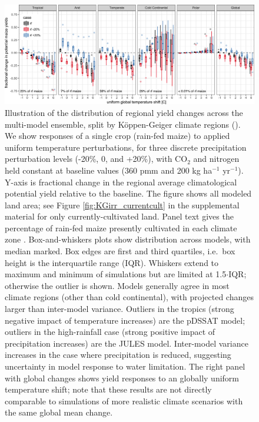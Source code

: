 \documentclass[preprint, 5p, times, twocolumn]{elsarticle}
\begin{document}
\begin{figure}[!b]
\centering
   \includegraphics[width=0.95\linewidth]{global_sim_CG.png}
   \caption{Illustration of the distribution of regional yield changes across the multi-model ensemble, split by K\"{o}ppen-Geiger climate regions (\cite{rubel2010}).
    We show responses of a single crop (rain-fed maize) to applied uniform temperature perturbations, for three discrete precipitation perturbation levels (-20\%, 0, and +20\%), with CO$_2$ and nitrogen held constant at baseline values (360 pmm and 200 kg ha$^{-1}$ yr$^{-1}$). Y-axis is fractional change in the regional average climatological potential yield relative to the baseline. The figure shows all modeled land area; see Figure \ref{fig:KGirr_currentcult} in the supplemental material for only currently-cultivated land. Panel text gives the percentage of rain-fed maize presently cultivated in each climate zone \citep{Portmann2010}. Box-and-whiskers plots show distribution across models, with median marked. Box edges are first and third quartiles, i.e.\ box height is the interquartile range (IQR). Whiskers extend to maximum and minimum of simulations but are limited at 1.5$\cdot$IQR; otherwise the outlier is shown. Models generally agree in most climate regions (other than cold continental), with projected changes larger than inter-model variance.  Outliers in the tropics (strong negative impact of temperature increases) are the pDSSAT model; outliers in the high-rainfall case (strong positive impact of precipitation increases) are the JULES model. Inter-model variance increases in the case where precipitation is reduced, suggesting uncertainty in model response to water limitation. The right panel with global changes shows yield responses to an globally uniform temperature shift; note that these results are not directly comparable to simulations of more realistic climate scenarios with the same global mean change.}
   \label{fig:globesim}
\end{figure}
\end{document}
